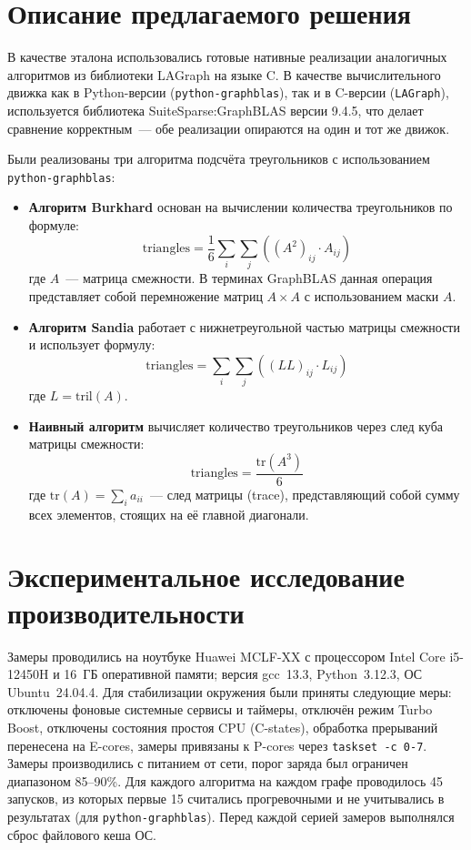 \documentclass[a4paper]{article}
\begin{document}
\section{Описание предлагаемого решения}

В качестве эталона использовались готовые нативные реализации аналогичных алгоритмов из библиотеки LAGraph на языке C.
В качестве вычислительного движка как в Python-версии (\texttt{python-graphblas}), так и в C-версии (\texttt{LAGraph}), используется библиотека SuiteSparse:GraphBLAS версии 9.4.5, что делает сравнение корректным~--- обе реализации опираются на один и тот же движок.

Были реализованы три алгоритма подсчёта треугольников с использованием \texttt{python-graphblas}:
\begin{itemize}
    \item \textbf{Алгоритм Burkhard} основан на вычислении количества треугольников по формуле:
    \[
    \text{triangles} = \frac{1}{6} \sum_{i} \sum_{j} \left( (A^2)_{ij} \cdot A_{ij} \right)
    \]
    где $A$~--- матрица смежности. В терминах GraphBLAS данная операция представляет собой перемножение матриц $A \times A$ с использованием маски $A$.
    
    \item \textbf{Алгоритм Sandia} работает с нижнетреугольной частью матрицы смежности и использует формулу:
    \[
    \text{triangles} = \sum_{i} \sum_{j} \left( (L L)_{ij} \cdot L_{ij} \right)
    \]
    где $L = \text{tril}(A)$.
    
    \item \textbf{Наивный алгоритм} вычисляет количество треугольников через след куба матрицы смежности:
    \[
    \text{triangles} = \frac{\text{tr}(A^3)}{6}
    \]
    где $\text{tr}(A) = \sum_{i} a_{ii}$~--- след матрицы (trace), представляющий собой сумму всех элементов, стоящих на её главной диагонали.
\end{itemize}
\section{Экспериментальное исследование производительности}

Замеры проводились на ноутбуке Huawei MCLF-XX с процессором Intel Core i5-12450H и 16~ГБ оперативной памяти; версия gcc~13.3, Python~3.12.3, ОС Ubuntu~24.04.4.
Для стабилизации окружения были приняты следующие меры: отключены фоновые системные сервисы и таймеры, отключён режим Turbo Boost, отключены состояния простоя CPU (C-states), обработка прерываний перенесена на E-cores, замеры привязаны к P-cores через \texttt{taskset -c 0-7}.
Замеры производились с питанием от сети, порог заряда был ограничен диапазоном 85--90\%.
Для каждого алгоритма на каждом графе проводилось 45 запусков, из которых первые 15 считались прогревочными и не учитывались в результатах (для \texttt{python-graphblas}).
Перед каждой серией замеров выполнялся сброс файлового кеша ОС.
\end{document}
